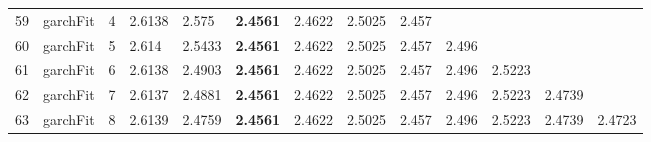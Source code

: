\documentclass[10pt,a4paper]{article}
\begin{document}
\begin{table}[ht]
\begin{tabular}{rlrllllllllll}
  59 & garchFit &     4 & 2.6138 & 2.575 & \textbf{2.4561} & 2.4622 & 2.5025 & 2.457 &  &  &  &  \\ 
  60 & garchFit &     5 & 2.614 & 2.5433 & \textbf{2.4561} & 2.4622 & 2.5025 & 2.457 & 2.496 &  &  &  \\ 
  61 & garchFit &     6 & 2.6138 & 2.4903 & \textbf{2.4561} & 2.4622 & 2.5025 & 2.457 & 2.496 & 2.5223 &  &  \\ 
  62 & garchFit &     7 & 2.6137 & 2.4881 & \textbf{2.4561} & 2.4622 & 2.5025 & 2.457 & 2.496 & 2.5223 & 2.4739 &  \\ 
  63 & garchFit &     8 & 2.6139 & 2.4759 & \textbf{2.4561} & 2.4622 & 2.5025 & 2.457 & 2.496 & 2.5223 & 2.4739 & 2.4723 \\ 
   \hline
\end{tabular}
\end{table}
\end{document}
